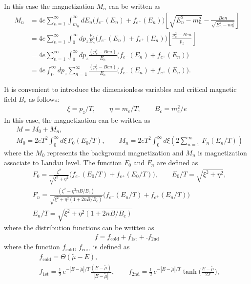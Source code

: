 \documentclass[sn-mathphys,Numbered]{sn-jnl}
\theoremstyle{thmstyleone}%
\theoremstyle{thmstyletwo}%
\theoremstyle{thmstylethree}%
\begin{document}
In this case the magnetization $M_n$ can be written as
\begin{align}
M_n&=4e\sum_{n=1}^\infty \int_{m_n}^\infty\!\!dE_n\bigg(f_{e^-}(E_n)+f_{e^+}(E_n)\bigg)\left[{\sqrt{E^2_n-m^2_n}}-\frac{Ben}{\sqrt{E^2_n-m^2_n}}\right]\\
&=4e\sum_{n=1}^\infty \int_{0}^\infty\!\!dp_z\frac{p_z}{E_n}\bigg(f_{e^-}(E_n)+f_{e^+}(E_n)\bigg)\left[\frac{p_z^2-Ben}{p_z}\right]\\
&=4e\sum_{n=1}^\infty \int_{0}^\infty\!\!dp_z\frac{(p_z^2-Ben)}{E_n}\bigg(f_{e^-}(E_n)+f_{e^+}(E_n)\bigg)\\
&=4e \int_{0}^\infty\!\!dp_z\sum_{n=1}^\infty\frac{(p_z^2-Ben)}{E_n}\bigg(f_{e^-}(E_n)+f_{e^+}(E_n)\bigg).
\end{align}


It is convenient to introduce the dimensionless variables and critical magnetic field $B_c$ as follows:
\begin{align}
\xi=p_z/T,\qquad \eta=m_e/T,\qquad B_c=m^2_e/e
\end{align}
In this case, the magnetization can be written as
\begin{align}
&M=M_0+M_n,\\
&M_0=2eT^2\int_0^\infty\!\!d\xi\, F_0(E_0/T),\qquad M_n=2eT^2\int_{0}^\infty\!\!d\xi\left(2\sum_{n=1}^\infty\,F_n(E_n/T)\right)
\end{align}
where the $M_0$ represents the background magnetization  and $M_n$ is magnetization associate to Landau level. The function $F_0$ and $F_n$ are defined as
\begin{align}
 &F_0=\frac{\xi^2}{\sqrt{\xi^2+\eta^2}}\bigg(f_{e^-}(E_0/T)+f_{e^+}(E_0/T)\bigg),\qquad {E_0}/{T}=\sqrt{\xi^2+\eta^2},\\
 &F_n=\frac{(\xi^2-\eta^2nB/B_c)}{\sqrt{\xi^2+\eta^2\left(1+2nB/B_c\right)}}\bigg(f_{e^-}(E_n/T)+f_{e^+}(E_n/T)\bigg)\\
&E_n/T=\sqrt{\xi^2+\eta^2\left(1+2nB/B_c\right)}
\end{align}
where the distribution functions can be written as
\begin{align}
f=f_{\mathrm{cold}}+f_\mathrm{1st}+.f_\mathrm{2nd}
\end{align}
where the function $f_{\mathrm{cold}}$, $f_\mathrm{corr}$ is defined as
\begin{align}
&f_{\mathrm{cold}}=\Theta(\tilde\mu-E),\\
&f_\mathrm{1st}=\frac{1}{2}\,e^{-|E-\tilde\mu|/T}\frac{(E-\tilde\mu)}{|E-\tilde\mu|},\qquad 
f_\mathrm{2nd}=\frac{1}{2}\,e^{-|E-\tilde\mu|/T}\tanh\bigg(\frac{E-\tilde\mu}{2T}\bigg),
\end{align}
\end{document}
